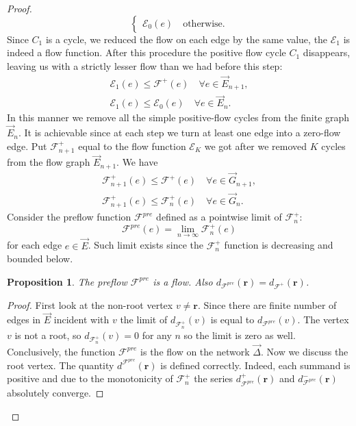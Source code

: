 \documentclass[12pt]{article}
\renewcommand{\cal}[1]{\mathcal{#1}}
\renewcommand{\leq}{\leqslant}
\newtheorem{prop}{Proposition}
\theoremstyle{definition}
\newcommand{\flowpos}{\mathcal{F}^{+}}
\newcommand{\preflow}{\mathcal{F}^{pre}}
\newcommand{\flowposn}[1]{\mathcal{F}_{#1}^{+}}
\renewcommand{\root}{\mathbf{r}}
\newcommand{\onet}{\vec{\Delta}}
\numberwithin{remark}{section}
\numberwithin{theorem}{section}
\numberwithin{prop}{section}
\numberwithin{equation}{section}
\numberwithin{lemma}{section}
\numberwithin{prop_under_lemma}{lemma}
\begin{document}
\begin{proof}
\begin{equation*}
\begin{cases}
          \cal{E}_0(e) \quad \text{otherwise}.
        \end{cases}
      \end{equation*}
      Since $C_1$ is a cycle, we reduced the flow on each edge by the same value,
        the $\cal{E}_1$ is indeed a flow function.
      After this procedure the positive flow cycle $C_1$ disappears,
        leaving us with a strictly lesser flow than we had before this step:
      \begin{align*}
        \cal{E}_1(e) \leq \flowpos(e) \quad \forall e \in \vec{E}_{n+1},\\
        \cal{E}_1(e) \leq \cal{E}_0(e) \quad \forall e \in \vec{E}_n.
      \end{align*}
      In this manner we remove all the simple positive-flow cycles from the finite graph $\vec{E}_n$.
      It is achievable since at each step we turn at least one edge into a zero-flow edge.
      Put $\flowposn{n+1}$ equal to the flow function $\cal{E}_K$ we got after we removed $K$ cycles from the flow graph $\vec{E}_{n+1}$.
      We have
      \begin{align*}
        \flowposn{n+1}(e) \leq \flowpos(e) \quad \forall e \in \vec{G}_{n+1},\\
        \flowposn{n+1}(e) \leq \flowposn{n}(e) \quad \forall e \in \vec{G}_n.
      \end{align*}
      Consider the preflow function $\preflow$ defined as a pointwise limit of $\flowposn{n}$:
      \[
        \preflow(e) = \lim_{n\to \infty}\flowposn{n}(e)
      \]
        for each edge $e \in \vec{E}$.
      Such limit exists since the $\flowposn{n}$ function is decreasing and bounded below.
      \begin{prop}
        The preflow $\preflow$ is a flow.
        Also $d_{\preflow}(\root) = d_{\flowpos}(\root)$.
      \end{prop}
      \begin{proof}
        First look at the non-root vertex $v \neq \root$.
        Since there are finite number of edges in $\vec{E}$ incident with $v$ the limit of
        $d_{\flowposn{n}}(v)$ is equal to $d_{\preflow}(v)$.
        The vertex $v$ is not a root, so $d_{\flowposn{n}}(v) = 0$ for any $n$ so the limit is zero as well.
        Conclusively, the function $\preflow$ is the flow on the network $\onet$.
        Now we discuss the root vertex.
        The quantity $d^{\preflow}(\root)$ is defined correctly.
        Indeed, each summand is positive and due to the monotonicity of $\flowposn{n}$ the series
          $d^{+}_{\preflow}(\root)$ and $d^{-}_{\preflow}(\root)$ absolutely converge.

\end{proof}
\end{proof}
\end{document}
